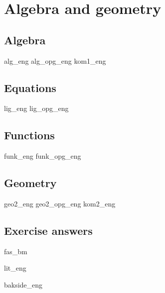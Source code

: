 \part{Algebra and geometry \label{Del2}}
\chapter{Algebra}
\newpage
{alg_eng}
{alg_opg_eng}
\newpage
{kom1_eng}

\chapter{Equations \label{Likningar}}
\newpage
{lig_eng}
{lig_opg_eng}

\chapter{Functions \label{Funksjoner}}
{funk_eng}
{funk_opg_eng}

\chapter{Geometry}
\newpage
{geo2_eng}
{geo2_opg_eng}
\newpage
{kom2_eng}

\newpage
{}
{}
\chapter*{Exercise answers}
{fas_bm}

{lit_eng}
{\printindex {}
	}
{bakside_eng}













